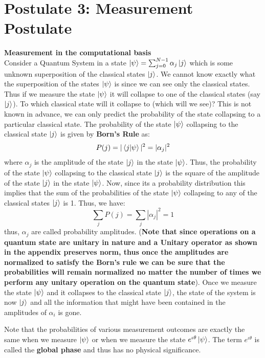\section{Postulate 3: Measurement Postulate}
\textbf{Measurement in the computational basis}\\
Consider a Quantum System in a state $\ket{\psi} = \sum_{j=0}^{N-1} \alpha_j \ket{j}$ which is some unknown superposition of the classical states $\ket{j}$. We cannot know exactly what the superposition of the states $\ket{\psi}$ is
since we can see only the classical states. Thus if we measure the state $\ket{\psi}$ it will collapse to one of the classical states
(say $\ket{j}$). To which classical state will it collapse to (which will we see)? This is not known in advance, we can
only predict the probability of the state collapsing to a particular classical state. The probability of the state $\ket{\psi}$ collapsing to the classical state $\ket{j}$ is given by
\textbf{Born's Rule} as:
\[
    P(j)=|\braket{j|\psi}|^2=|\alpha_j|^2
\]
where $\alpha_j$ is the amplitude of the state $\ket{j}$ in the state $\ket{\psi}$. Thus, the probability of the state $\ket{\psi}$ collapsing to the classical state $\ket{j}$ is the square of the amplitude of the state $\ket{j}$ in the state $\ket{\psi}$.
Now, since its a probability distribution this implies that the sum of the probabilities of the state $\ket{\psi}$ collapsing to any of the classical states $\ket{j}$ is 1. Thus, we have:
\[
    \sum_{j}P(j)=\sum_{j}|\alpha_j|^2=1
\]
thus, $\alpha_j$ are called probability amplitudes. (\textbf{Note that since operations on a quantum state are unitary in nature and 
a Unitary operator as shown in the appendix preserves norm, thus once the amplitudes are normalized to satisfy the Born's rule we can be sure that the probabilities will remain normalized no matter the number
of times we perform any unitary operation on the quantum state}). Once we measure the state 
$\ket{\psi}$ and it collapses to the classical state $\ket{j}$, the state of the system is now $\ket{j}$ and all the information that might have been contained in the amplitudes of $\alpha_i$ is gone.

Note that the probabilities of various measurement outcomes are exactly the same when we measure $\ket{\psi}$ or when we measure 
the state $e^{\iota \theta}\ket{\psi}$. The term $e^{\iota \theta}$ is called the \textbf{global phase} and thus has no physical significance.

